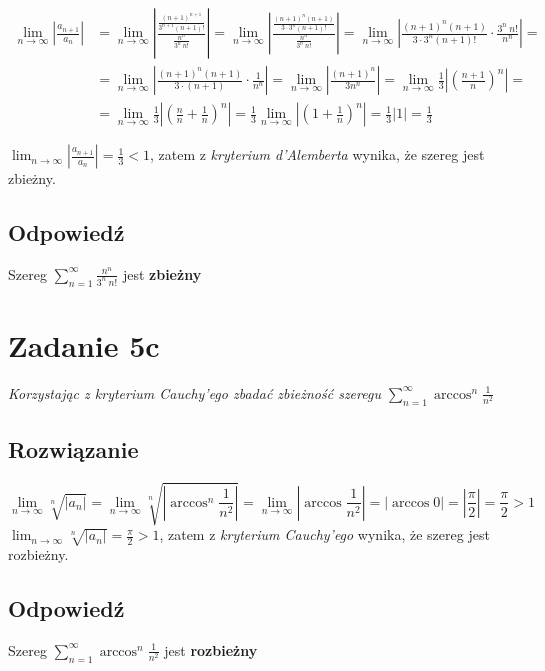 \documentclass{article}
\newcommand{\task}[1]{\textit{#1}}
\DeclareMathOperator{\?}{?}
\begin{document}
\begin{equation*}
   \begin{aligned}
         \lim_{n \to \infty} \left| \frac{a_{n+1}}{a_n} \right|
      &= \lim_{n \to \infty} \left| \frac{\frac{(n+1)^{n+1}}{3^{n+1}(n+1)!}}{\frac{n^n}{3^n\ n!}} \right| =
         \lim_{n \to \infty} \left| \frac{\frac{(n+1)^n (n+1)}{3\cdot 3^n(n+1)!}}{\frac{n^n}{3^n\ n!}} \right| =
         \lim_{n \to \infty} \left| \frac{(n+1)^n (n+1)}{3\cdot 3^n(n+1)!} \cdot \frac{3^n\ n!}{n^n} \right| =\\
      &= \lim_{n \to \infty} \left| \frac{(n+1)^n (n+1)}{3\cdot (n+1)} \cdot \frac{1}{n^n} \right| =
         \lim_{n \to \infty} \left| \frac{(n+1)^n}{3n^n} \right| =
         \lim_{n \to \infty} \frac{1}{3} \left| \left(\frac{n+1}{n}\right)^n \right| =\\
      &= \lim_{n \to \infty} \frac{1}{3} \left| \left(\frac{n}{n} + \frac{1}{n}\right)^n \right| =
         \frac{1}{3} \lim_{n \to \infty} \left| \left(1 + \frac{1}{n}\right)^n \right| =
         \frac{1}{3} \left| 1 \right| = \frac{1}{3}
   \end{aligned}
\end{equation*}

$\displaystyle \lim_{n \to \infty} \left| \frac{a_{n+1}}{a_n} \right | = \frac{1}{3} < 1 $,
zatem z \textit{kryterium d'Alemberta} wynika, że szereg jest zbieżny.

\subsection*{Odpowiedź}
\centerline{Szereg $\displaystyle \sum_{n=1}^{\infty}{\frac{n^n}{3^n\ n!}}$ jest \textbf{zbieżny}}

\clearpage

\section*{Zadanie 5c}
\task{Korzystając z kryterium Cauchy’ego zbadać zbieżność szeregu
$\displaystyle \sum_{n=1}^{\infty}{\arccos^n{\frac{1}{n^2}}} $}

\subsection*{Rozwiązanie}

\begin{equation*}
      \lim_{n \to \infty} \sqrt[n]{|a_n|} =
      \lim_{n \to \infty} \sqrt[n]{\left|\arccos^n{\frac{1}{n^2}}\right|} =
      \lim_{n \to \infty} \left|\arccos{\frac{1}{n^2}}\right| =
      |\arccos{0}| = \left|\frac{\pi}{2}\right| = \frac{\pi}{2} > 1
\end{equation*}
$\displaystyle \lim_{n \to \infty} \sqrt[n]{|a_n|} = \frac{\pi}{2} > 1 $, zatem z \textit{kryterium
Cauchy'ego} wynika, że szereg jest rozbieżny.

\subsection*{Odpowiedź}
\centerline{Szereg $\displaystyle \sum_{n=1}^{\infty}{\arccos^n{\frac{1}{n^2}}} $
jest \textbf{rozbieżny}}
\end{document}
